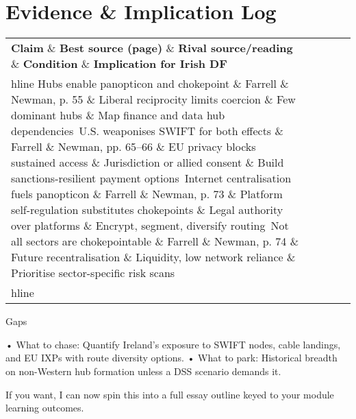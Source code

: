 \section*{Evidence \& Implication Log}
\begin{tabular}{p{3.2cm}p{4.2cm}p{3.6cm}p{3.2cm}p{4.2cm}}
	\textbf{Claim} \& \textbf{Best source (page)} \& \textbf{Rival source/reading} \& \textbf{Condition} \& \textbf{Implication for Irish DF}\\hline
	Hubs enable panopticon and chokepoint \& Farrell \& Newman, p. 55 \& Liberal reciprocity limits coercion \& Few dominant hubs \& Map finance and data hub dependencies\
	U.S. weaponises SWIFT for both effects \& Farrell \& Newman, pp. 65–66 \& EU privacy blocks sustained access \& Jurisdiction or allied consent \& Build sanctions-resilient payment options\
	Internet centralisation fuels panopticon \& Farrell \& Newman, p. 73 \& Platform self-regulation substitutes chokepoints \& Legal authority over platforms \& Encrypt, segment, diversify routing\
	Not all sectors are chokepointable \& Farrell \& Newman, p. 74 \& Future recentralisation \& Liquidity, low network reliance \& Prioritise sector-specific risk scans\\hline
\end{tabular}

Gaps

• What to chase: Quantify Ireland’s exposure to SWIFT nodes, cable landings, and EU IXPs with route diversity options.
• What to park: Historical breadth on non-Western hub formation unless a DSS scenario demands it.

If you want, I can now spin this into a full essay outline keyed to your module learning outcomes.

\parencite{EU_2019}
